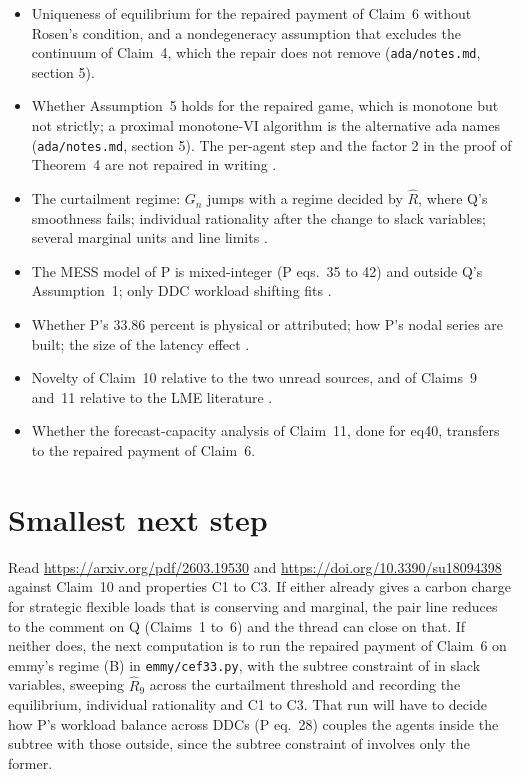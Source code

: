 \documentclass{article}
\begin{document}
\begin{itemize}
\item Uniqueness of equilibrium for the repaired payment of Claim~6 without Rosen's condition, and a nondegeneracy assumption that excludes the continuum of Claim~4, which the repair does not remove  (\texttt{ada/notes.md}, section 5).
\item Whether Assumption~5 holds for the repaired game, which is monotone but not strictly; a proximal monotone-VI algorithm is the alternative ada names (\texttt{ada/notes.md}, section 5). The per-agent step and the factor 2 in the proof of Theorem~4 are not repaired in writing .
\item The curtailment regime: \(G_n\) jumps with a regime decided by \(\hat R\), where Q's smoothness fails; individual rationality after the change to slack variables; several marginal units and line limits .
\item The MESS model of P is mixed-integer (P eqs.~35 to 42) and outside Q's Assumption~1; only DDC workload shifting fits .
\item Whether P's 33.86 percent is physical or attributed; how P's nodal series are built; the size of the latency effect .
\item Novelty of Claim~10 relative to the two unread sources, and of Claims~9 and~11 relative to the LME literature .
\item Whether the forecast-capacity analysis of Claim~11, done for eq40, transfers to the repaired payment of Claim~6.
\end{itemize}

\section{Smallest next step}

Read \url{https://arxiv.org/pdf/2603.19530} and \url{https://doi.org/10.3390/su18094398} against Claim~10 and properties C1 to C3. If either already gives a carbon charge for strategic flexible loads that is conserving and marginal, the pair line reduces to the comment on Q (Claims~1 to~6) and the thread can close on that. If neither does, the next computation is to run the repaired payment of Claim~6 on emmy's regime (B) in \texttt{emmy/cef33.py}, with the subtree constraint of  in slack variables, sweeping \(\hat R_9\) across the curtailment threshold and recording the equilibrium, individual rationality and C1 to C3. That run will have to decide how P's workload balance across DDCs (P eq.~28) couples the agents inside the subtree with those outside, since the subtree constraint of  involves only the former.
\end{document}
